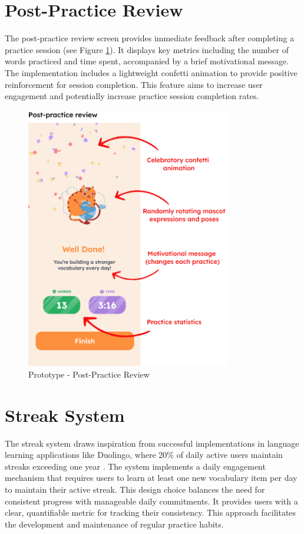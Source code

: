 \section{Post-Practice Review}

The post-practice review screen provides immediate feedback after completing a practice session (see Figure \ref{fig:em-prototype-practice-review}). It displays key metrics including the number of words practiced and time spent, accompanied by a brief motivational message. The implementation includes a lightweight confetti animation to provide positive reinforcement for session completion. This feature aims to increase user engagement and potentially increase practice session completion rates.
\begin{figure}[!h]
    \includegraphics[width=0.8\textwidth]{src/figures/em-prototype-review.png}
    \caption{Prototype - Post-Practice Review}
    \label{fig:em-prototype-practice-review}
\end{figure}

\section{Streak System}

The streak system draws inspiration from successful implementations in language learning applications like Duolingo, where 20\% of 
daily active users maintain streaks exceeding one year \cite
{cite:duolingo_2024q2}. The system implements a daily engagement mechanism that requires users to learn at least one new vocabulary item per day to maintain their active streak. This design choice balances the need for consistent progress with manageable daily commitments. It provides users with a clear, quantifiable metric for tracking their consistency. This approach facilitates the development and maintenance of regular practice habits.

